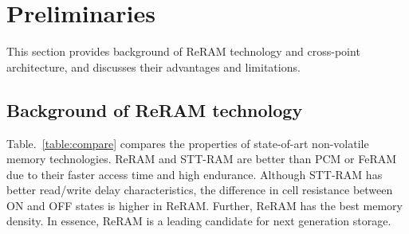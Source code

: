 \section{Preliminaries}\label{sec:preliminary}

This section provides background of ReRAM technology and cross-point architecture, and discusses their advantages and limitations. %


\subsection{Background of ReRAM technology}
Table.~\ref{table:compare} compares the properties of state-of-art non-volatile memory technologies. ReRAM and STT-RAM are better than PCM or FeRAM due to their faster access time and high endurance.
Although STT-RAM has better read/write delay characteristics, the difference in cell resistance between ON and OFF states is higher in ReRAM. Further, ReRAM has the best memory density.
In essence, ReRAM is a leading candidate for next generation storage.
%

